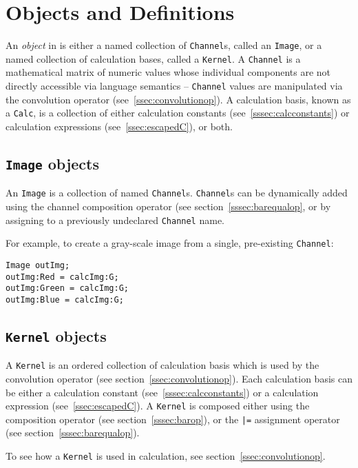 \section{Objects and Definitions}
\label{sec:objdef}
An \emph{object} in \sys{} is either a named collection of \texttt{Channel}s, called an
\texttt{Image}, or a named collection of calculation bases, called a
\texttt{Kernel}. A \texttt{Channel} is a mathematical matrix of numeric values
whose individual components are not directly accessible via \sys{} language
semantics -- \texttt{Channel} values are manipulated via the convolution
operator (see~\ref{ssec:convolutionop}). A calculation basis, known as a
\texttt{Calc}, is a collection of either calculation constants
(see~\ref{sssec:calcconstants}) or calculation expressions (see~\ref{ssec:escapedC}),
or both.

\subsection{\texttt{Image} objects}
\label{ssec:images}
An \texttt{Image} is a collection of named \texttt{Channel}s. \texttt{Channel}s can
be dynamically added  using the channel composition
operator (see section~\ref{sssec:barequalop}, or by assigning to a previously
undeclared \texttt{Channel} name. 

For example, to create a gray-scale image from a single, pre-existing
\texttt{Channel}:
\begin{lstlisting}[language=CLAM,escapechar=\%]
Image outImg;
outImg:Red = calcImg:G;
outImg:Green = calcImg:G;
outImg:Blue = calcImg:G;
\end{lstlisting}

\subsection{\texttt{Kernel} objects}
\label{ssec:kernels}
A \texttt{Kernel} is an ordered collection of calculation basis which is used by the convolution
operator (see section~\ref{ssec:convolutionop}). Each calculation basis can be either
a calculation constant (see~\ref{sssec:calcconstants}) or a calculation expression
(see~\ref{ssec:escapedC}). A \texttt{Kernel} is composed either using the composition
operator (see section~\ref{sssec:barop}), or the \texttt{|=} assignment operator (see section~\ref{sssec:barequalop}).

To see how a \texttt{Kernel} is used in calculation, see section~\ref{ssec:convolutionop}.
